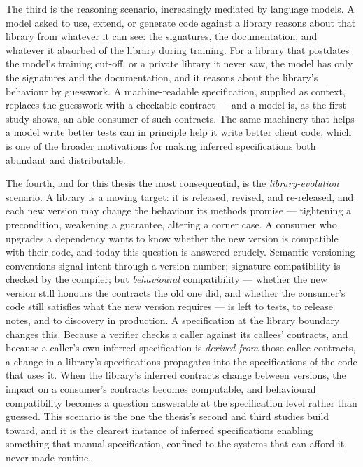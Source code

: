 The third is the reasoning scenario, increasingly mediated by language models. A
model asked to use, extend, or generate code against a library reasons about that
library from whatever it can see: the signatures, the documentation, and whatever
it absorbed of the library during training. For a library that postdates the
model's training cut-off, or a private library it never saw, the model has only
the signatures and the documentation, and it reasons about the library's
behaviour by guesswork. A machine-readable specification, supplied as context,
replaces the guesswork with a checkable contract --- and a model is, as the first
study shows, an able consumer of such contracts. The same machinery that helps a
model write better tests can in principle help it write better client code,
which is one of the broader motivations for making inferred specifications both
abundant and distributable.

The fourth, and for this thesis the most consequential, is the
\emph{library-evolution} scenario. A library is a moving target: it is released,
revised, and re-released, and each new version may change the behaviour its
methods promise --- tightening a precondition, weakening a guarantee, altering a
corner case. A consumer who upgrades a dependency wants to know whether the new
version is compatible with their code, and today this question is answered
crudely. Semantic versioning conventions signal intent through a version number;
signature compatibility is checked by the compiler; but \emph{behavioural}
compatibility --- whether the new version still honours the contracts the old one
did, and whether the consumer's code still satisfies what the new version
requires --- is left to tests, to release notes, and to discovery in production.
A specification at the library boundary changes this. Because a verifier checks a
caller against its callees' contracts, and because a caller's own inferred
specification is \emph{derived from} those callee contracts, a change in a
library's specifications propagates into the specifications of the code that uses
it. When the library's inferred contracts change between versions, the impact on
a consumer's contracts becomes computable, and behavioural compatibility becomes a
question answerable at the specification level rather than guessed. This scenario
is the one the thesis's second and third studies build toward, and it is the
clearest instance of inferred specifications enabling something that manual
specification, confined to the systems that can afford it, never made routine.

